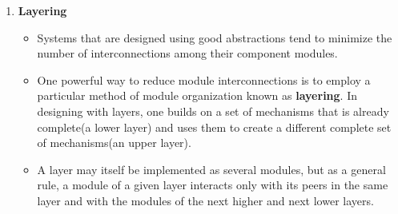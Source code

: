 \documentclass{article}
\begin{document}
\begin{enumerate}
    \item \textbf{Layering}
    \begin{itemize}
        \item Systems that are designed using good abstractions tend to minimize the number of interconnections among their component modules. 
        \item One powerful way to reduce module interconnections is to employ a particular method of module organization known as \textbf{layering}. In designing with layers, one builds on a set of mechanisms that is already complete(a lower layer) and uses them to create a different complete set of mechanisms(an upper layer).
        \item A layer may itself be implemented as several modules, but as a general rule, a module of a given layer interacts only with its peers in the same layer and with the modules of the next higher and next lower layers.
        

\end{itemize}
\end{enumerate}
\end{document}
